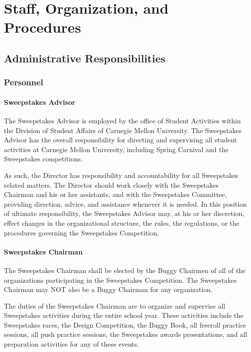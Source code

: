 \chapter{Staff, Organization, and Procedures}

\section{Administrative Responsibilities}

\subsection{Personnel}

\subsubsection{Sweepstakes Advisor}

The Sweepstakes Advisor is employed by the office of Student Activities within the Division of Student Affairs of Carnegie Mellon University. The Sweepstakes Advisor has the overall responsibility for directing and supervising all student activities at Carnegie Mellon University, including Spring Carnival and the Sweepstakes competitions.

As such, the Director has responsibility and accountability for all Sweepstakes related matters. The Director should work closely with the Sweepstakes Chairman and his or her assistants, and with the Sweepstakes Committee, providing direction, advice, and assistance whenever it is needed. In this position of ultimate responsibility, the Sweepstakes Advisor may, at his or her discretion, effect changes in the organizational structure, the rules, the regulations, or the procedures governing the Sweepstakes Competition.

\subsubsection{Sweepstakes Chairman}

The Sweepstakes Chairman shall be elected by the Buggy Chairmen of all of the organizations participating in the Sweepstakes Competition. The Sweepstakes Chairman may NOT also be a Buggy Chairman for any organization.

The duties of the Sweepstakes Chairman are to organize and supervise all Sweepstakes activities during the entire school year. These activities include the Sweepstakes races, the Design Competition, the Buggy Book, all freeroll practice sessions, all push practice sessions, the Sweepstakes awards presentations, and all preparation activities for any of these events.

